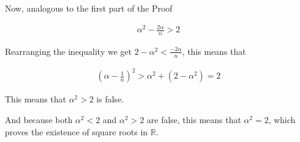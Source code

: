 \documentclass{article}
\begin{document}
Now, analogous to the first part of the Proof

\begin{align*}
    \alpha^{2} - \frac{2\alpha}{n} > 2
\end{align*}

Rearranging the inequality we get $2-\alpha^{2} < \frac{-2\alpha}{n}$, this
means that

\begin{align*}
    \left(\alpha - \frac{1}{n}\right)^{2} > \alpha^{2} + (2-\alpha^{2}) = 2
\end{align*}

This means that $\alpha^{2} > 2$ is false.

And because both $\alpha^{2} < 2$ and $\alpha^{2} > 2$ are false, this means
that $\alpha^{2} = 2$, which proves the existence of square roots in $\mathbb{R}$.
\end{document}
